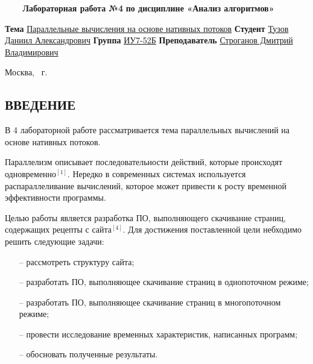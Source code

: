 \documentclass{article}
\begin{document}
\begin{titlepage}
	\noindent\begin{minipage}{1.0\textwidth}\centering
		\Large\textbf{   ~~~ Лабораторная работа №4}\newline
		\textbf{по дисциплине «Анализ алгоритмов»}\newline\newline\newline\newline\newline
	\end{minipage}

	\noindent\textbf{Тема} \underline{Параллельные вычисления на основе нативных потоков}\newline\newline
	\textbf{Студент} \underline{Тузов Даниил Александрович}\newline\newline
	\textbf{Группа} \underline{ИУ7-52Б}\newline\newline
	\textbf{Преподаватель} \underline{Строганов Дмитрий Владимирович}
	
	\begin{center}
		\vfill
		Москва, \the\year ~г.
	\end{center}
	\restoregeometry
	\clearpage
\end{titlepage}

\renewcommand{\contentsname}{\begin{center}СОДЕРЖАНИЕ\end{center}} 
\tableofcontents
\setcounter{page}{2}
\clearpage

\begin{center}\section*{ВВЕДЕНИЕ}\end{center}

В 4 лабораторной работе рассматривается тема параллельных вычислений на основе нативных потоков.

Параллелизм описывает последовательности действий, которые происходят одновременно$^{[1]}$. Нередко в современных 
системах используется распараллеливание вычислений, которое может привести к росту временной эффективности программы.

Целью работы является разработка ПО, выполняющего скачивание страниц, содержащих рецепты с сайта$^{[4]}$.
Для достижения поставленной цели небходимо решить следующие задачи:
\begin{itemize}
	\item[--] рассмотреть структуру сайта;
	\item[--] разработать ПО, выполняющее скачивание страниц в однопоточном режиме;
	\item[--] разработать ПО, выполняющее скачивание страниц в многопоточном режиме;
	\item[--] провести исследование временных характеристик, написанных программ;
	\item[--] обосновать полученные результаты.
\end{itemize}
\end{document}
